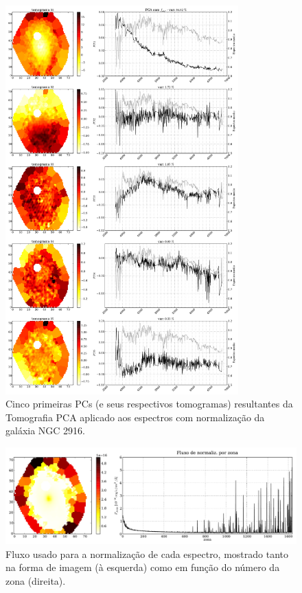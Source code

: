 \begin{figure}
    \includegraphics[width=0.8\textwidth]{figuras/K0277-tomo-obs-norm.pdf}
    \caption[Tomogramas de 1 a 5 da gal\'axia NGC 2916 - $f_{obs}$.]
    {Cinco primeiras PCs (e seus respectivos tomogramas) resultantes da Tomografia PCA aplicado aos espectros com
    normalização da galáxia NGC 2916.}
    \label{fig:K0277tomofobsnorm}
\end{figure}

\begin{figure}
    \includegraphics[width=1.\textwidth]{figuras/K0277-fobs_norm.pdf}
    \caption[Fluxos de normalização para cada zona da galáxia K0277.]
    {Fluxo usado para a normalização de cada espectro, mostrado tanto na forma de imagem (à esquerda) como em função do
    número da zona (direita).}
    \label{fig:K0277fobsnorm}
\end{figure}

